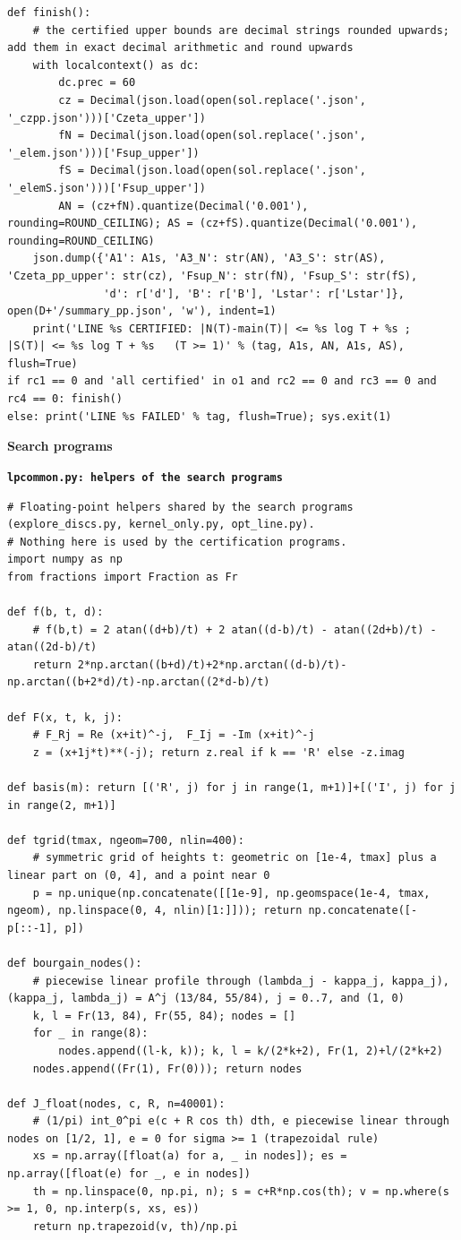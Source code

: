 \documentclass[11pt,reqno]{amsart}
\numberwithin{equation}{section}
\theoremstyle{definition}
\theoremstyle{remark}
\newcommand{\appsub}[1]{\par\medskip\noindent\textbf{#1}\par\nobreak\smallskip}
\begin{document}
\begin{lstlisting}
def finish():
    # the certified upper bounds are decimal strings rounded upwards; add them in exact decimal arithmetic and round upwards
    with localcontext() as dc:
        dc.prec = 60
        cz = Decimal(json.load(open(sol.replace('.json', '_czpp.json')))['Czeta_upper'])
        fN = Decimal(json.load(open(sol.replace('.json', '_elem.json')))['Fsup_upper'])
        fS = Decimal(json.load(open(sol.replace('.json', '_elemS.json')))['Fsup_upper'])
        AN = (cz+fN).quantize(Decimal('0.001'), rounding=ROUND_CEILING); AS = (cz+fS).quantize(Decimal('0.001'), rounding=ROUND_CEILING)
    json.dump({'A1': A1s, 'A3_N': str(AN), 'A3_S': str(AS), 'Czeta_pp_upper': str(cz), 'Fsup_N': str(fN), 'Fsup_S': str(fS),
               'd': r['d'], 'B': r['B'], 'Lstar': r['Lstar']}, open(D+'/summary_pp.json', 'w'), indent=1)
    print('LINE %s CERTIFIED: |N(T)-main(T)| <= %s log T + %s ;  |S(T)| <= %s log T + %s   (T >= 1)' % (tag, A1s, AN, A1s, AS), flush=True)
if rc1 == 0 and 'all certified' in o1 and rc2 == 0 and rc3 == 0 and rc4 == 0: finish()
else: print('LINE %s FAILED' % tag, flush=True); sys.exit(1)
\end{lstlisting}
\appsub{Search programs}\label{app:search}
\appsub{\texttt{lpcommon.py: helpers of the search programs}}
\begin{lstlisting}
# Floating-point helpers shared by the search programs (explore_discs.py, kernel_only.py, opt_line.py).
# Nothing here is used by the certification programs.
import numpy as np
from fractions import Fraction as Fr

def f(b, t, d):
    # f(b,t) = 2 atan((d+b)/t) + 2 atan((d-b)/t) - atan((2d+b)/t) - atan((2d-b)/t)
    return 2*np.arctan((b+d)/t)+2*np.arctan((d-b)/t)-np.arctan((b+2*d)/t)-np.arctan((2*d-b)/t)

def F(x, t, k, j):
    # F_Rj = Re (x+it)^-j,  F_Ij = -Im (x+it)^-j
    z = (x+1j*t)**(-j); return z.real if k == 'R' else -z.imag

def basis(m): return [('R', j) for j in range(1, m+1)]+[('I', j) for j in range(2, m+1)]

def tgrid(tmax, ngeom=700, nlin=400):
    # symmetric grid of heights t: geometric on [1e-4, tmax] plus a linear part on (0, 4], and a point near 0
    p = np.unique(np.concatenate([[1e-9], np.geomspace(1e-4, tmax, ngeom), np.linspace(0, 4, nlin)[1:]])); return np.concatenate([-p[::-1], p])

def bourgain_nodes():
    # piecewise linear profile through (lambda_j - kappa_j, kappa_j), (kappa_j, lambda_j) = A^j (13/84, 55/84), j = 0..7, and (1, 0)
    k, l = Fr(13, 84), Fr(55, 84); nodes = []
    for _ in range(8):
        nodes.append((l-k, k)); k, l = k/(2*k+2), Fr(1, 2)+l/(2*k+2)
    nodes.append((Fr(1), Fr(0))); return nodes

def J_float(nodes, c, R, n=40001):
    # (1/pi) int_0^pi e(c + R cos th) dth, e piecewise linear through nodes on [1/2, 1], e = 0 for sigma >= 1 (trapezoidal rule)
    xs = np.array([float(a) for a, _ in nodes]); es = np.array([float(e) for _, e in nodes])
    th = np.linspace(0, np.pi, n); s = c+R*np.cos(th); v = np.where(s >= 1, 0, np.interp(s, xs, es))
    return np.trapezoid(v, th)/np.pi
\end{lstlisting}
\end{document}
